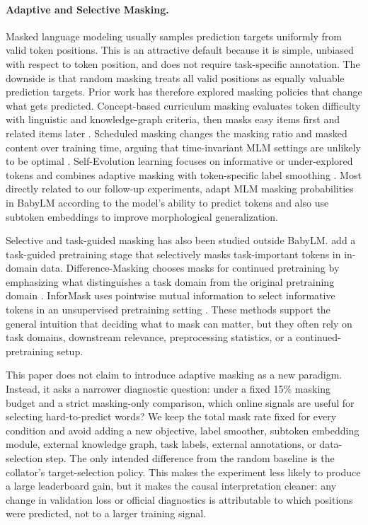 \paragraph{Adaptive and Selective Masking.}
Masked language modeling usually samples prediction targets uniformly from valid token positions. This is an attractive default because it is simple, unbiased with respect to token position, and does not require task-specific annotation. The downside is that random masking treats all valid positions as equally valuable prediction targets. Prior work has therefore explored masking policies that change what gets predicted. Concept-based curriculum masking evaluates token difficulty with linguistic and knowledge-graph criteria, then masks easy items first and related items later \citep{lee2022efficient}. Scheduled masking changes the masking ratio and masked content over training time, arguing that time-invariant MLM settings are unlikely to be optimal \citep{yang2023learning}. Self-Evolution learning focuses on informative or under-explored tokens and combines adaptive masking with token-specific label smoothing \citep{zhong2023self}. Most directly related to our follow-up experiments, \citet{edman2025mask} adapt MLM masking probabilities in BabyLM according to the model's ability to predict tokens and also use subtoken embeddings to improve morphological generalization.

Selective and task-guided masking has also been studied outside BabyLM. \citet{gu2020train} add a task-guided pretraining stage that selectively masks task-important tokens in in-domain data. Difference-Masking chooses masks for continued pretraining by emphasizing what distinguishes a task domain from the original pretraining domain \citep{wilf2023difference}. InforMask uses pointwise mutual information to select informative tokens in an unsupervised pretraining setting \citep{sadeq2022informask}. These methods support the general intuition that deciding what to mask can matter, but they often rely on task domains, downstream relevance, preprocessing statistics, or a continued-pretraining setup.

This paper does not claim to introduce adaptive masking as a new paradigm. Instead, it asks a narrower diagnostic question: under a fixed 15\% masking budget and a strict masking-only comparison, which online signals are useful for selecting hard-to-predict words? We keep the total mask rate fixed for every condition and avoid adding a new objective, label smoother, subtoken embedding module, external knowledge graph, task labels, external annotations, or data-selection step. The only intended difference from the random baseline is the collator's target-selection policy. This makes the experiment less likely to produce a large leaderboard gain, but it makes the causal interpretation cleaner: any change in validation loss or official diagnostics is attributable to which positions were predicted, not to a larger training signal.

